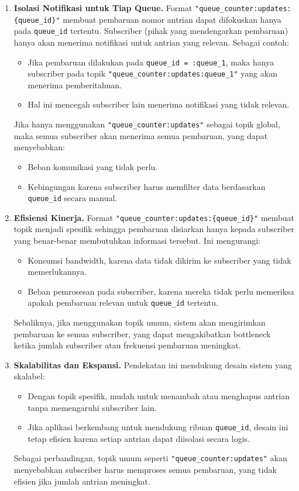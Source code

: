 \begin{enumerate}
	\item \textbf{Isolasi Notifikasi untuk Tiap Queue.} Format \texttt{"queue\_counter:updates:\{queue\_id\}"} membuat pembaruan nomor antrian dapat difokuskan hanya pada \texttt{queue\_id} tertentu. Subscriber (pihak yang mendengarkan pembaruan) hanya akan menerima notifikasi untuk antrian yang relevan. Sebagai contoh:
	\begin{itemize}
		\item Jika pembaruan dilakukan pada \texttt{queue\_id = :queue\_1}, maka hanya subscriber pada topik \texttt{"queue\_counter:updates:queue\_1"} yang akan menerima pemberitahuan.
		\item Hal ini mencegah subscriber lain menerima notifikasi yang tidak relevan.
	\end{itemize}
	Jika hanya menggunakan \texttt{"queue\_counter:updates"} sebagai topik global, maka semua subscriber akan menerima semua pembaruan, yang dapat menyebabkan:
	\begin{itemize}
		\item Beban komunikasi yang tidak perlu.
		\item Kebingungan karena subscriber harus memfilter data berdasarkan \texttt{queue\_id} secara manual.
	\end{itemize}
	
	\item \textbf{Efisiensi Kinerja.} Format \texttt{"queue\_counter:updates:\{queue\_id\}"} membuat topik menjadi spesifik sehingga pembaruan disiarkan hanya kepada subscriber yang benar-benar membutuhkan informasi tersebut. Ini mengurangi:
	\begin{itemize}
		\item Konsumsi bandwidth, karena data tidak dikirim ke subscriber yang tidak memerlukannya.
		\item Beban pemrosesan pada subscriber, karena mereka tidak perlu memeriksa apakah pembaruan relevan untuk \texttt{queue\_id} tertentu.
	\end{itemize}
	Sebaliknya, jika menggunakan topik umum, sistem akan mengirimkan pembaruan ke semua subscriber, yang dapat mengakibatkan bottleneck ketika jumlah subscriber atau frekuensi pembaruan meningkat.
	
	\item \textbf{Skalabilitas dan Ekspansi.} Pendekatan ini mendukung desain sistem yang skalabel:
	\begin{itemize}
		\item Dengan topik spesifik, mudah untuk menambah atau menghapus antrian tanpa memengaruhi subscriber lain.
		\item Jika aplikasi berkembang untuk mendukung ribuan \texttt{queue\_id}, desain ini tetap efisien karena setiap antrian dapat diisolasi secara logis.
	\end{itemize}
	Sebagai perbandingan, topik umum seperti \texttt{"queue\_counter:updates"} akan menyebabkan subscriber harus memproses semua pembaruan, yang tidak efisien jika jumlah antrian meningkat.
	

\end{enumerate}
